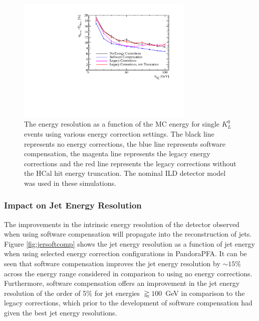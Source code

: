 \begin{figure}[h!]
\includegraphics[width=0.75\textwidth]{EnergyEstimators/Plots/SoftComp/EnergyResolution/ER_vs_Kaon0LSoftComp_Kaon0L.pdf}
\caption[The energy resolution as a function of the MC energy for single $K^{0}_{L}$ events using various energy correction settings.  The black line represents no energy corrections, the blue line represents software compensation, the magenta line represents the legacy energy corrections and the red line represents the legacy corrections without the HCal hit energy truncation.  The nominal ILD detector model was used in these simulations.]{The energy resolution as a function of the MC energy for single $K^{0}_{L}$ events using various energy correction settings.  The black line represents no energy corrections, the blue line represents software compensation, the magenta line represents the legacy energy corrections and the red line represents the legacy corrections without the HCal hit energy truncation.  The nominal ILD detector model was used in these simulations.}
\label{fig:ersoftcomp}
\end{figure}


\subsubsection{Impact on Jet Energy Resolution}
The improvements in the intrinsic energy resolution of the detector observed when using software compensation will propagate into the reconstruction of jets.  Figure \ref{fig:jersoftcomp} shows the jet energy resolution as a function of jet energy when using selected energy correction configurations in PandoraPFA.  It can be seen that software compensation improves the jet energy resolution by $\sim 15 \%$ across the energy range considered in comparison to using no energy corrections.  Furthermore, software compensation offers an improvement in the jet energy resolution of the order of 5\% for jet energies $\gtrapprox 100$~GeV in comparison to the legacy corrections, which prior to the development of software compensation had given the best jet energy resolutions.

